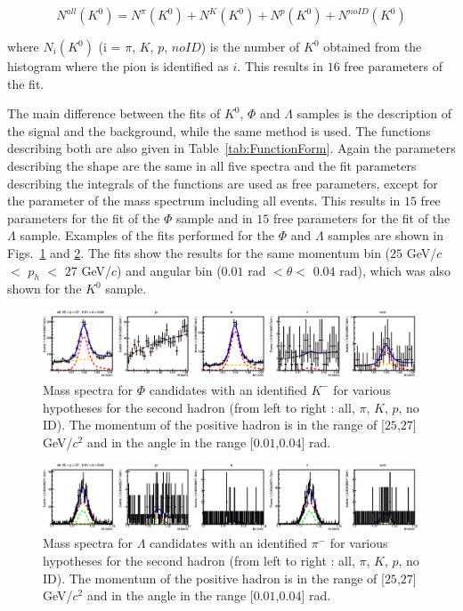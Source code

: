 \begin{equation}
  N^{all}(K^0) = N^{\pi}(K^0) + N^{K}(K^0) + N^{p}(K^0) + N^{noID}(K^0)
\end{equation}

where $N_i(K^0)$ (i = $\pi$, $K$, $p$, $noID$) is the number of $K^0$ obtained from the histogram where the pion is identified as $i$. This results in $16$ free parameters of the fit.

The main difference between the fits of $K^0$, $\Phi$ and $\Lambda$ samples is the description of the signal and the background, while the same method is used. The functions describing both are also given in Table~\ref{tab:FunctionForm}. Again the parameters describing the shape are the same in all five spectra and the fit parameters  describing the integrals of the functions are used as free parameters, except for the parameter of the mass spectrum including all events. This results in $15$ free parameters for the fit of the $\Phi$ sample and in $15$ free parameters for the fit of the $\Lambda$ sample. Examples of the fits performed for the $\Phi$ and $\Lambda$ samples are shown in Figs.~\ref{pic:PhiMassSpectra} and \ref{pic:LambdaMassSpectra}. The fits show the results for the same momentum bin ($25$ GeV/$c$ $<$ $p_h$ $<$ $27$ GeV/$c$) and angular bin ($0.01$ rad $< \theta <$ $0.04$ rad), which was also shown for the $K^0$ sample.

\begin{figure}[!h]
  \centering
	\includegraphics[scale=0.3]{./gfx/PhiMassSpectra.png}
	\caption{Mass spectra for $\Phi$ candidates with an identified $K^-$ for various hypotheses for the second hadron (from left to right : all, $\pi$, $K$, $p$, no ID). The momentum of the positive hadron is in the range of [$25$,$27$] GeV/$c^2$ and in the angle in the range [$0.01$,$0.04$] rad.}
	\label{pic:PhiMassSpectra}
\end{figure}

\begin{figure}[!h]
  \centering
	\includegraphics[scale=0.3]{./gfx/LambdaMassSpectra.png}
	\caption{Mass spectra for $\Lambda$ candidates with an identified $\pi^-$ for various hypotheses for the second hadron (from left to right : all, $\pi$, $K$, $p$, no ID). The momentum of the positive hadron is in the range of [$25$,$27$] GeV/$c^2$ and in the angle in the range [$0.01$,$0.04$] rad.}
	\label{pic:LambdaMassSpectra}
\end{figure}

